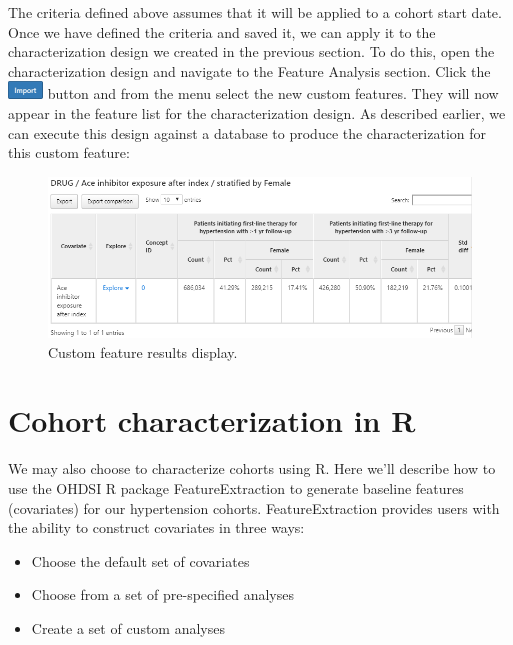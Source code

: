 \documentclass[11pt]{book}
\providecommand{\tightlist}{%
  \setlength{\itemsep}{0pt}\setlength{\parskip}{0pt}}
\theoremstyle{definition}
\theoremstyle{definition}
\theoremstyle{definition}
\theoremstyle{remark}
\begin{document}
The criteria defined above assumes that it will be applied to a cohort start date. Once we have defined the criteria and saved it, we can apply it to the characterization design we created in the previous section. To do this, open the characterization design and navigate to the Feature Analysis section. Click the \includegraphics{images/Characterization/atlasImportButton.png} button and from the menu select the new custom features. They will now appear in the feature list for the characterization design. As described earlier, we can execute this design against a database to produce the characterization for this custom feature:

\begin{figure}

{\centering \includegraphics[width=1\linewidth]{images/Characterization/atlasCharacterizationCustomFeatureResults} 

}

\caption{Custom feature results display.}\label{fig:atlasCharacterizationCustomFeatureResults}
\end{figure}

\hypertarget{cohort-characterization-in-r}{%
\section{Cohort characterization in R}\label{cohort-characterization-in-r}}

We may also choose to characterize cohorts using R. Here we'll describe how to use the OHDSI R package FeatureExtraction to generate baseline features (covariates) for our hypertension cohorts. FeatureExtraction provides users with the ability to construct covariates in three ways: 

\begin{itemize}
\tightlist
\item
  Choose the default set of covariates
\item
  Choose from a set of pre-specified analyses
\item
  Create a set of custom analyses
\end{itemize}
\end{document}
